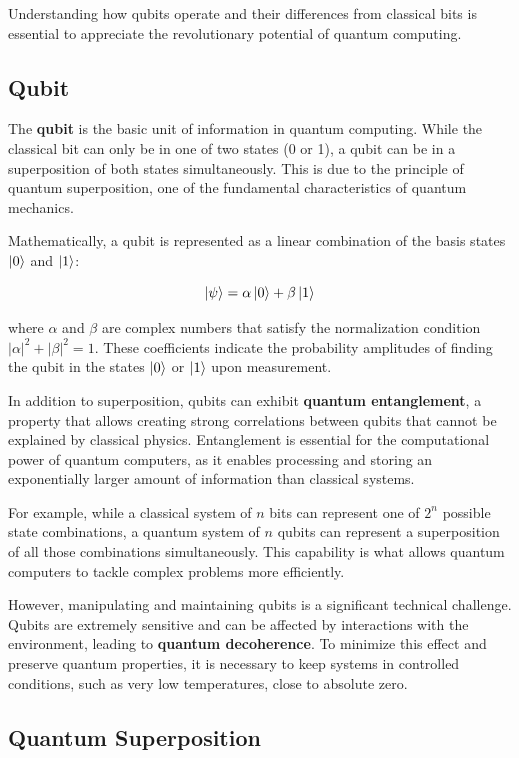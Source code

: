 Understanding how qubits operate and their differences from classical bits is essential to appreciate the revolutionary potential of quantum computing.

\subsection{Qubit}

The \textbf{qubit} is the basic unit of information in quantum computing. While the classical bit can only be in one of two states (0 or 1), a qubit can be in a superposition of both states simultaneously. This is due to the principle of quantum superposition, one of the fundamental characteristics of quantum mechanics.

Mathematically, a qubit is represented as a linear combination of the basis states $\ket{0}$ and $\ket{1}$:

\[
\ket{\psi} = \alpha\ket{0} + \beta\ket{1}
\]

where $\alpha$ and $\beta$ are complex numbers that satisfy the normalization condition $|\alpha|^2 + |\beta|^2 = 1$. These coefficients indicate the probability amplitudes of finding the qubit in the states $\ket{0}$ or $\ket{1}$ upon measurement.

In addition to superposition, qubits can exhibit \textbf{quantum entanglement}, a property that allows creating strong correlations between qubits that cannot be explained by classical physics. Entanglement is essential for the computational power of quantum computers, as it enables processing and storing an exponentially larger amount of information than classical systems.

For example, while a classical system of $n$ bits can represent one of $2^n$ possible state combinations, a quantum system of $n$ qubits can represent a superposition of all those combinations simultaneously. This capability is what allows quantum computers to tackle complex problems more efficiently.

However, manipulating and maintaining qubits is a significant technical challenge. Qubits are extremely sensitive and can be affected by interactions with the environment, leading to \textbf{quantum decoherence}. To minimize this effect and preserve quantum properties, it is necessary to keep systems in controlled conditions, such as very low temperatures, close to absolute zero.

\subsection{Quantum Superposition}

